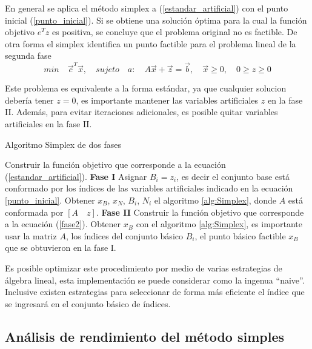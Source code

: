 En general se aplica el método simplex a (\ref{estandar_artificial}) con el punto inicial (\ref{punto_inicial}).
%
Si se obtiene una solución óptima para la cual la función objetivo $e^T z$ es positiva, se concluye que el problema original no es factible.
%
De otra forma el simplex identifica un punto factible para el problema lineal de la segunda fase
\begin{equation} \label{fase2}
min \quad \vec{c}^T \vec{x}, \quad sujeto \quad a: \quad A\vec{x} +  \vec{z} = \vec{b}, \quad \vec{x} \geq 0, \quad 0 \geq z \geq 0
\end{equation}

Este problema es equivalente a la forma estándar, ya que cualquier solucion debería tener $z=0$, es importante mantener las variables artificiales $z$ en la fase II.
%
Además, para evitar iteraciones adicionales, es posible quitar variables artificiales en la fase II.


\begin{algorithm}[!t]
\caption{Algoritmo Simplex de dos fases}
\label{alg:Simplex_fases}
\begin{scriptsize}
\begin{algorithmic}[1]
\STATE Construir la función objetivo que corresponde a la ecuación (\ref{estandar_artificial}).
\STATE \textbf{Fase I}
\STATE Asignar $B_i = z_i$, es decir el conjunto base está conformado por los índices de las variables artificiales indicado en la ecuación \ref{punto_inicial}.
\STATE Obtener $x_B$, $x_N$, $B_i$, $N_i$  el algoritmo \ref{alg:Simplex}, donde $A$ está conformada por $[ A \quad  z]$.
\STATE \textbf{Fase II}
\STATE Construir la función objetivo que corresponde a la ecuación (\ref{fase2}).
\STATE Obtener $x_B$ con  el algoritmo \ref{alg:Simplex}, es importante usar la matriz $A$, los índices del conjunto básico $B_i$, el punto básico factible $x_B$ que se obtuvieron en la fase I.
\end{algorithmic}
\end{scriptsize}
\end{algorithm}

Es posible optimizar este procedimiento por medio de varias estrategias de álgebra lineal, esta implementación se puede considerar como la ingenua ``naive''.
%
Inclusive existen estrategias para seleccionar de forma más eficiente el índice que se ingresará en el conjunto básico de índices.

\subsection{Análisis de rendimiento del método simples}

